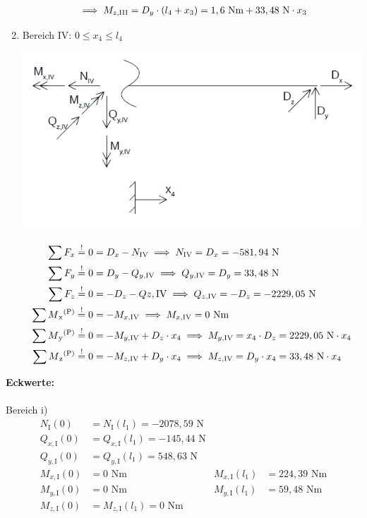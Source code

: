 \begin{enumerate}
\begin{align*}
				&\implies  M_{z,\mathrm{III}} =  D_y \cdot (l_4 + x_3) = 1,6 \text{ Nm} +33,48 \text{ N} \cdot x_3\\
	\end{align*}
\item Bereich IV: $0 \leq x_4 \leq l_4$
\begin{center}
	\includegraphics[width=1.04\textwidth,keepaspectratio]{figures/Bereich4.png}
\end{center}
\begin{align*}
	\sum F_x &\overset{!}{=} 0 = D_x - N_{\mathrm{IV}} 
		\implies  N_{\mathrm{IV}} = D_x = -581,94 \text { N}\\ 
	\sum F_y &\overset{!}{=} 0 =D_y - Q_{y,\mathrm{IV}}
		\implies Q_{y,\mathrm{IV}} = D_y = 33,48 \text{ N}\\ 
	\sum F_z &\overset{!}{=} 0 = -D_z -Q{z,\mathrm{IV}} 
		\implies Q_{z,\mathrm{IV}} = -D_z = -2229,05 \text{ N} \\ 
	\sum M\textsubscript{x}\textsuperscript{(P)} &\overset{!}{=} 0 =- M_{x,\mathrm{IV}}  
		\implies M_{x,\mathrm{IV}} = 0 \text{ Nm} \\ 
	\sum M\textsubscript{y}\textsuperscript{(P)} &\overset{!}{=} 0 =- M_{y,\mathrm{IV}} + D_z \cdot  x_4 
		\implies M_{y,\mathrm{IV}} =  x_4 \cdot D_z =2229,05 \text{ N} \cdot x_4\\ 
	\sum M\textsubscript{z}\textsuperscript{(P)} &\overset{!}{=} 0 = - M_{z,\mathrm{IV}} + D_y \cdot  x_4  
		\implies  M_{z,\mathrm{IV}} =  D_y \cdot x_4 = 33,48 \text{ N} \cdot x_4
	\end{align*}
\end{enumerate}
\newpage
\textbf{Eckwerte:}\\ \\
Bereich i)
\begin{align*}
	N_{\mathrm{I}} (0) &= N_{\mathrm{I}} (l_1) = -2078,59 \text{ N}\\
	Q_{x,\mathrm{I}} (0) &= Q_{x,\mathrm{I}} (l_1) = -145,44\text{ N}\\
	Q_{y,\mathrm{I}} (0) &= Q_{y,\mathrm{I}} (l_1) = 548,63\text{ N}\\
	M_{x,\mathrm{I}} (0) &=  0\text{ Nm} & M_{x,\mathrm{I}} (l_1) &= 224,39\text{ Nm}\\
	M_{y,\mathrm{I}} (0) &=  0\text{ Nm} & M_{y,\mathrm{I}} (l_1) &= 59,48\text{ Nm}\\
	M_{z,\mathrm{I}} (0) &= M_{z,\mathrm{I}} (l_1) = 0\text{ Nm}\\
\end{align*}
